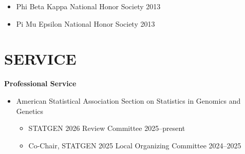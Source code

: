 \documentclass[margin]{res}
\newcommand{\annotateItem}[1]{
	\begin{itemize} \vspace{-0.1cm}
	\item[] 
	\begin{footnotesize}\textcolor{black}{(#1)}\end{footnotesize}
	\end{itemize} \vspace{-0.1cm}
}
\begin{document}
\begin{resume}
\begin{itemize}
\item Phi Beta Kappa National Honor Society \hfill 2013 

\item Pi Mu Epsilon National Honor Society \hfill 2013 %


\end{itemize}







\section{SERVICE}  

\textbf{Professional Service}
	\begin{itemize}
	
	\item American Statistical Association Section on Statistics in Genomics and Genetics
		\begin{itemize}
		
		\item STATGEN 2026 Review Committee \hfill 2025--present
		
		\item Co-Chair, STATGEN 2025 Local Organizing Committee \hfill 2024--2025
		
		

\end{itemize}
\end{itemize}
\end{resume}
\end{document}
